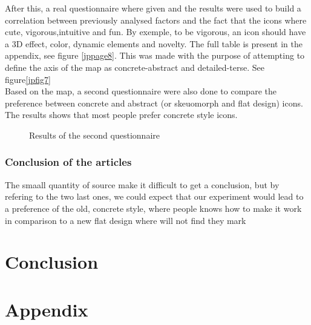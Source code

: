 \documentclass[a4paper,11pt] {article}
\theoremstyle{definition}
\begin{document}
After this, a real questionnaire where given and the results were used to build a correlation between previously analysed factors and the fact that the icons where cute, vigorous,intuitive and fun. By exemple, to be vigorous, an icon should have a 3D effect, color, dynamic elements and novelty. The full table is present in the appendix, see figure \ref{jppage8}. This was made with the purpose of attempting to define the axis of the map as concrete-abstract and detailed-terse. See figure\ref{jpfig7}
\\
Based on the map, a second questionnaire were also done to compare the preference between concrete and abstract (or skeuomorph and flat design) icons. The results shows that most people prefer concrete style icons.
\begin{figure}[H] 
  \caption{Results of the second questionnaire}\label{jppage10}
\end{figure}
    \subsubsection{Conclusion of the articles}
        The smaall quantity of source make it difficult to get a conclusion, but by refering to the two last ones, we could expect that our experiment would lead to a preference of the old, concrete style, where people knows how to make it work in comparison to a new flat design where will not find they mark
\section{Conclusion}

\newpage
\section{Appendix}
\end{document}
